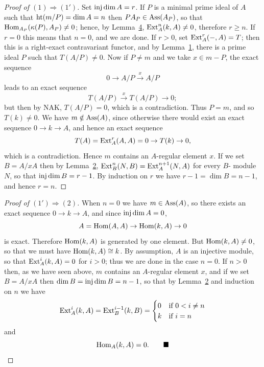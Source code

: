 \begin{proof}[Proof of $(1) \Rightarrow (1')$]
Set $\operatorname{inj\,dim} A = r$. If $P$ is a minimal prime ideal of $A$
such that $\operatorname{ht} (m/P) = \dim A = n$ then $PA_P \in \operatorname{Ass}(A_P)$, so that
$\operatorname{Hom}_{A_P}(\kappa(P), A_P) \neq 0$; hence, by Lemma~\hyperref[lem:18.4]{4}, $\operatorname{Ext}^n_A(k, A) \neq 0$, therefore $r \ge n$.
If $r = 0$ this means that $n = 0$, and we are done. If $r > 0$, set $\operatorname{Ext}^r_A(-, A) =
T$; then this is a right-exact contravariant functor, and by Lemma~\hyperref[lem:18.1]{1},
there is a prime ideal $P$ such that $T(A/P) \neq 0$. Now if $P \neq m$ and we take
$x \in m - P$, the exact sequence
\[
  0 \to A/P \xrightarrow{x} A/P
\]
leads to an exact sequence
\[
  T(A/P) \xrightarrow{x} T(A/P) \to 0;
\]
but then by NAK, $T(A/P) = 0$, which is a contradiction. Thus $P = m$, and
so $T(k) \neq 0$. We have $m \notin \operatorname{Ass}(A)$, since otherwise there would exist an
exact sequence $0 \to k \to A$, and hence an exact sequence
\[
  T(A) = \operatorname{Ext}^r_A(A, A) = 0 \to T(k) \to 0,
\]
which is a contradiction. Hence $m$ contains an $A$-regular element $x$. If we set
$B = A/xA$ then by Lemma~\hyperref[lem:18.2]{2}, $\operatorname{Ext}^n_B(N, B) = \operatorname{Ext}^{n+1}_A(N, A)$ for every $B$-
module $N$, so that $\operatorname{inj\,dim} B = r - 1$. By induction on $r$ we have $r - 1 =
\dim B = n - 1$, and hence $r = n$.
\end{proof}

\begin{proof}[Proof of $(1') \Rightarrow (2)$]
When $n = 0$ we have $m \in \operatorname{Ass}(A)$, so there exists an exact
sequence $0 \to k \to A$, and since $\operatorname{inj\,dim} A = 0$,
\[
  A = \operatorname{Hom}(A, A) \to \operatorname{Hom}(k, A) \to 0
\]
is exact. Therefore $\operatorname{Hom}(k, A)$ is generated by one element. But
$\operatorname{Hom} (k, A) \neq 0$, so that we must have $\operatorname{Hom} (k, A) \cong k$. By assumption, $A$ is
an injective module, so that $\operatorname{Ext}^i_A(k, A) = 0$ for $i > 0$; thus we are done in the
case $n = 0$. If $n > 0$ then, as we have seen above, $m$ contains an $A$-regular
element $x$, and if we set $B = A/xA$ then $\dim B = \operatorname{inj\,dim} B = n - 1$, so that by
Lemma~\hyperref[lem:18.2]{2} and induction on $n$ we have
\[
  \operatorname{Ext}^i_A(k, A) = \operatorname{Ext}^{i-1}_B(k, B) =
  \begin{cases}
    0 & \text{if } 0 < i \neq n \\
    k & \text{if } i = n
  \end{cases}
\]
and
\[
  \operatorname{Hom}_A(k, A) = 0. \qquad\blacksquare
\]
\end{proof}

